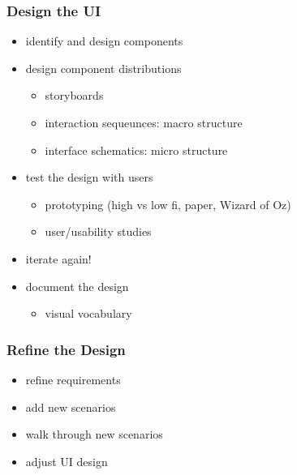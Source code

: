 \documentclass[]{article}
\theoremstyle{definition}
\begin{document}
					\subsubsection{Design the UI}
						\begin{itemize}
							\item identify and design components
							\item design component distributions
								\begin{itemize}
									\item storyboards
									\item interaction sequeunces: macro structure
									\item interface schematics: micro structure
								\end{itemize}
							\item test the design with users
								\begin{itemize}
									\item prototyping (high vs low fi, paper, Wizard of Oz)
									\item user/usability studies
								\end{itemize}
							\item iterate again!
							\item document the design
								\begin{itemize}
									\item visual vocabulary
								\end{itemize}
						\end{itemize}
					\subsubsection{Refine the Design}
						\begin{itemize}
							\item refine requirements
							\item add new scenarios
							\item walk through new scenarios
							\item adjust UI design
						\end{itemize}


				
\end{document}
